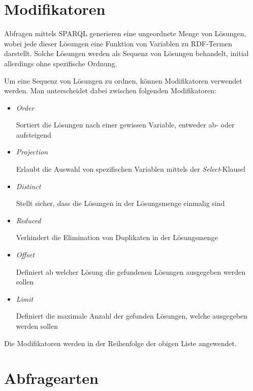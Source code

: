 \section{Modifikatoren}
\label{sec:sparql_modifikatoren}

Abfragen mittels SPARQL generieren eine ungeordnete Menge von Lösungen, wobei jede dieser Lösungen eine Funktion von Variablen zu RDF-Termen darstellt. Solche Lösungen werden als Sequenz von Lösungen behandelt, initial allerdings ohne spezifische Ordnung.~\cite[15 Solution Sequences and Modifiers]{w3sparql_querylang}

Um eine Sequenz von Lösungen zu ordnen, können Modifikatoren verwendet werden. Man unterscheidet dabei zwischen folgenden Modifikatoren:

\begin{itemize}
\item \textit{Order}

Sortiert die Lösungen nach einer gewissen Variable, entweder ab- oder aufsteigend

\item \textit{Projection}

Erlaubt die Auswahl von spezifischen Variablen mittels der \textit{Select}-Klausel

\item \textit{Distinct}

Stellt sicher, dass die Lösungen in der Lösungsmenge einmalig sind

\item \textit{Reduced}

Verhindert die Elimination von Duplikaten in der Lösungsmenge

\item \textit{Offset}

Definiert ab welcher Lösung die gefundenen Lösungen ausgegeben werden sollen

\item \textit{Limit}

Definiert die maximale Anzahl der gefunden Lösungen, welche ausgegeben werden sollen

\end{itemize}

Die Modifikatoren werden in der Reihenfolge der obigen Liste angewendet.~\cite[vgl. 15 Solution Sequences and Modifiers]{w3sparql_querylang}


\section{Abfragearten}
\label{sec:sparql_abfragearten}


